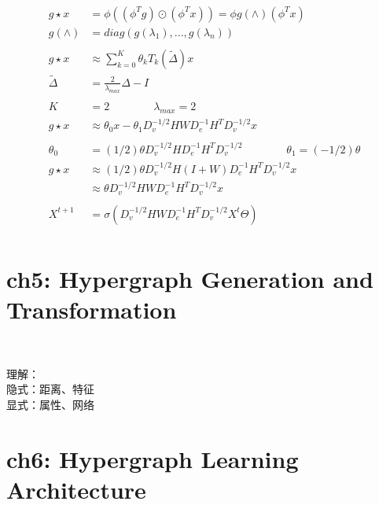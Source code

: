\documentclass{article}
\begin{document}
~ \\[3pt]
%
\begin{align*}
    ~ \\[3pt]
    g \star x &= \phi ( (\phi^{T} g) \odot (\phi^{T} x) ) 
              = \phi g(\wedge) (\phi^{T} x)  \\[3pt]
    g(\wedge) &= diag( g(\lambda_{1}), ..., g(\lambda_{n}) )  \\[3pt]
    ~ \\[3pt]
    g \star x & \approx \sum_{k=0}^{K} \theta_{k} T_{k} ( \tilde{\Delta} ) x  \\[3pt]
    \tilde{\Delta} & = \frac{2}{\lambda_{max}} \Delta - I  \\[3pt]
    ~ \\[3pt]
    K & = 2  \qquad \qquad \lambda_{max} = 2  \\[3pt]
    g \star x & \approx \theta_{0}x - \theta_{1} 
        D_{v}^{-1/2} H W D_{e}^{-1} H^{T} D_{v}^{-1/2} x  \\[3pt]
    ~ \\[3pt]
    \theta_{0} &= (1/2) \theta D_{v}^{-1/2} H D_{e}^{-1} H^{T} D_{v}^{-1/2} \qquad \qquad 
    \theta_{1} = (-1/2) \theta  \\[3pt]
    g \star x & \approx (1/2) \theta D_{v}^{-1/2} H (I+W) D_{e}^{-1} H^{T} D_{v}^{-1/2} x  \\[3pt]
              & \approx \theta D_{v}^{-1/2} H W D_{e}^{-1} H^{T} D_{v}^{-1/2} x  \\[3pt]
    ~ \\[3pt]
    X^{t+1} &= \sigma ( D_{v}^{-1/2} H W D_{e}^{-1} H^{T} D_{v}^{-1/2} X^{t} \varTheta )  \\[3pt]
\end{align*}


\newpage
\section*{ch5: Hypergraph Generation and Transformation}


~ \\[3pt]
\begin{CJK}{UTF8}{gbsn}
    理解： \\[3pt]
        隐式：距离、特征  \\[3pt]
        显式：属性、网络  \\[3pt]
\end{CJK}


\newpage
\section*{ch6: Hypergraph Learning Architecture}
\end{document}

